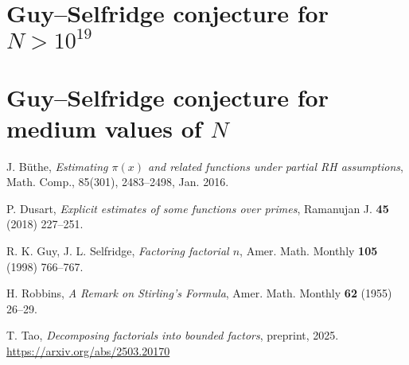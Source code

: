 \documentclass[12pt,a4paper,reqno]{amsart}
\numberwithin{equation}{section}
\theoremstyle{plain}
\theoremstyle{definition}
\begin{document}
\section{Guy--Selfridge conjecture for $N > 10^{19}$}


\section{Guy--Selfridge conjecture for medium values of $N$}



\begin{thebibliography}{10}

J. B\"uthe, \emph{Estimating $\pi(x)$ and related functions under partial RH assumptions}, Math. Comp., 85(301), 2483--2498, Jan. 2016.

P. Dusart, \emph{Explicit estimates of some functions over primes}, Ramanujan J. \textbf{45} (2018) 227--251.

R. K. Guy, J. L. Selfridge, \emph{Factoring factorial $n$}, Amer. Math. Monthly \textbf{105} (1998) 766--767.

H. Robbins, \emph{A Remark on Stirling's Formula}, Amer. Math. Monthly \textbf{62} (1955) 26--29.

T. Tao, \emph{Decomposing factorials into bounded factors}, preprint, 2025. \url{https://arxiv.org/abs/2503.20170}

\end{thebibliography}
\end{document}
